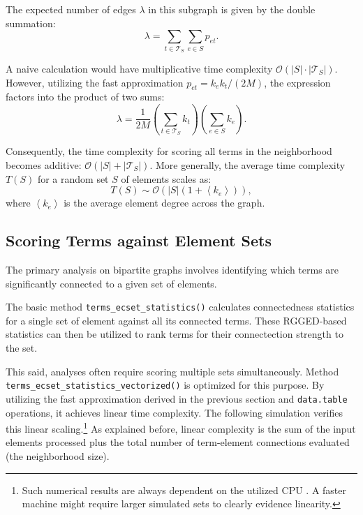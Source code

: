 \documentclass{article}\usepackage[]{graphicx}\usepackage[]{xcolor}
\begin{document}
The expected number of edges $\lambda$ in this subgraph is given by the double summation:
\begin{equation}
\lambda = \sum_{t \in \mathcal{T}_S} \sum_{e \in S} p_{et}.
\end{equation}

A naive calculation would have multiplicative time complexity $\mathcal{O}\left( |S| \cdot |\mathcal{T}_S| \right)$. However, utilizing the fast approximation $p_{et} = k_ek_t/(2M)$, the expression factors into the product of two sums:
\begin{equation}
 \lambda = \frac{1}{2M} \left( \sum_{t \in \mathcal{T}_S} k_t \right) \left( \sum_{e \in S} k_e \right).
\end{equation}

Consequently, the time complexity for scoring all terms in the neighborhood becomes additive: $\mathcal{O}\left( |S| + |\mathcal{T}_S| \right)$. More generally, the average time complexity $T(S)$ for a random set $S$ of elements scales as:
\begin{equation}
T(S) \sim \mathcal{O} \left( \left| S \right| \left( 1 + \left< k_e\right> \right) \right),
\end{equation}
where $\left< k_e \right>$ is the average element degree across the graph.

\subsection{Scoring Terms against Element Sets}

The primary analysis on bipartite graphs involves identifying which terms are significantly connected to a given set of elements.


The basic method \texttt{terms\_ecset\_statistics()} calculates connectedness statistics for a single set of element against all its connected terms. These RGGED-based statistics can then be utilized to rank terms for their connectection strength to the set.

This said, analyses often require scoring multiple sets simultaneously. Method \texttt{terms\_ecset\_statistics\_vectorized()} is optimized for this purpose. By utilizing the fast approximation derived in the previous section and \texttt{data.table} operations, it achieves linear time complexity. The following simulation verifies this linear scaling.\footnote{Such numerical results are always dependent on the utilized CPU . A faster machine might require larger simulated sets to clearly evidence linearity.} As explained before, linear complexity is the sum of the input elements processed plus the total number of term-element connections evaluated (the neighborhood size).
\end{document}
